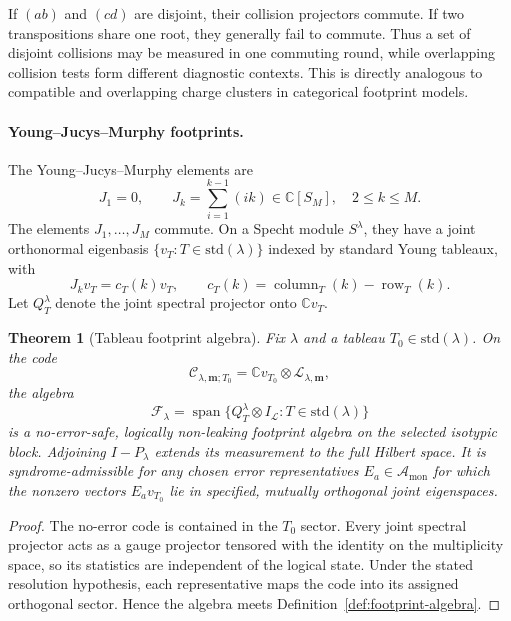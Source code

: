 \documentclass[11pt]{article}
\newtheorem{theorem}{Theorem}[section]
\theoremstyle{definition}
\theoremstyle{remark}
\newcommand{\C}{\mathbb C}
\newcommand{\cA}{\mathcal A}
\newcommand{\cF}{\mathcal F}
\newcommand{\cC}{\mathcal C}
\newcommand{\cL}{\mathcal L}
\newcommand{\Span}{\operatorname{span}}
\newcommand{\std}{\mathrm{std}}
\begin{document}
If $(ab)$ and $(cd)$ are disjoint, their collision projectors commute.  If two transpositions share one root, they generally fail to commute.  Thus a set of disjoint collisions may be measured in one commuting round, while overlapping collision tests form different diagnostic contexts.  This is directly analogous to compatible and overlapping charge clusters in categorical footprint models.

\paragraph{Young--Jucys--Murphy footprints.}

The Young--Jucys--Murphy elements are \cite{VershikOkounkov2005}
\begin{equation}\label{eq:YJM}
 J_1=0,
 \qquad
 J_k=\sum_{i=1}^{k-1}(ik)\in\C[S_M],
 \quad 2\leq k\leq M.
\end{equation}
The elements $J_1,\ldots,J_M$ commute.  On a Specht module $S^\lambda$, they have a joint orthonormal eigenbasis $\{v_T:T\in\std(\lambda)\}$ indexed by standard Young tableaux, with
\begin{equation}\label{eq:YJM-content}
 J_kv_T=c_T(k)v_T,
 \qquad
 c_T(k)=\operatorname{column}_T(k)-\operatorname{row}_T(k).
\end{equation}
Let $Q_T^\lambda$ denote the joint spectral projector onto $\C v_T$.

\begin{theorem}[Tableau footprint algebra]\label{thm:YJM-footprint}
Fix $\lambda$ and a tableau $T_0\in\std(\lambda)$.  On the code
\[
 \cC_{\lambda,\boldsymbol m;T_0}
 =\C v_{T_0}\otimes\cL_{\lambda,\boldsymbol m},
\]
the algebra
\begin{equation}\label{eq:tableau-footprint-algebra}
 \cF_\lambda
 =\Span\{Q_T^\lambda\otimes I_{\cL}:T\in\std(\lambda)\}
\end{equation}
is a no-error-safe, logically non-leaking footprint algebra on the selected isotypic block.  Adjoining $I-P_\lambda$ extends its measurement to the full Hilbert space.  It is syndrome-admissible for any chosen error representatives $E_a\in\cA_{\mathrm{mon}}$ for which the nonzero vectors $E_av_{T_0}$ lie in specified, mutually orthogonal joint eigenspaces.
\end{theorem}

\begin{proof}
The no-error code is contained in the $T_0$ sector.  Every joint spectral projector acts as a gauge projector tensored with the identity on the multiplicity space, so its statistics are independent of the logical state.  Under the stated resolution hypothesis, each representative maps the code into its assigned orthogonal sector.  Hence the algebra meets Definition~\ref{def:footprint-algebra}.
\end{proof}
\end{document}
